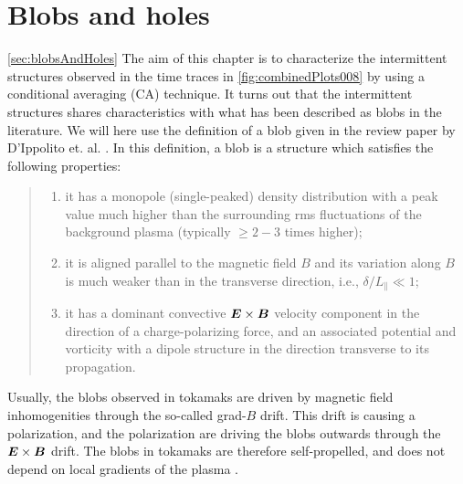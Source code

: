 \section{Blobs and holes}
\cref{sec:blobsAndHoles}
%
The aim of this chapter is to characterize the intermittent structures observed in the time traces in \cref{fig:combinedPlots008} by using a conditional averaging (CA) technique.
It turns out that the intermittent structures shares characteristics with what has been described as blobs in the literature.
We will here use the definition of a blob given in the review paper by D'Ippolito et. al. \cite{DIppolito2011}.
In this definition, a blob is a structure which satisfies the following properties:
%
\begin{quote}
    \begin{enumerate}[noitemsep]
            \item  it has a monopole (single-peaked) density distribution with a peak value much higher than the surrounding rms fluctuations of the background plasma (typically $\geq 2-3$ times higher);
            \item  it is aligned parallel to the magnetic field $B$ and its variation along $B$ is much weaker than in the transverse direction, i.e., $\delta/L_\|\ll1$;
            \item it has a dominant convective $\boldsymbol{E}\times\boldsymbol{B}$ velocity component in the direction of a charge-polarizing force, and an associated potential and vorticity with a dipole structure in the direction transverse to its propagation.
    \end{enumerate}
\end{quote}
%
Usually, the blobs observed in tokamaks are driven by magnetic field inhomogenities through the so-called grad-$B$ drift.
This drift is causing a polarization, and the polarization are driving the blobs outwards through the $\boldsymbol{E}\times\boldsymbol{B}$ drift.
The blobs in tokamaks are therefore self-propelled, and does not depend on local gradients of the plasma \cite{Krasheninnikov2008}.

